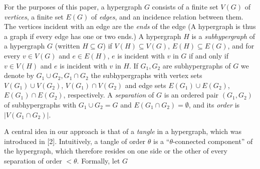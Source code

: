 For the purposes of this paper, a hypergraph $G$ consists of a finite set $V(G)$ of \textit{vertices}, a finite set $E(G)$ of \textit{edges}, and an incidence relation between them. The vertices incident with an edge are the \textit{ends} of the edge (A hypergraph is thus a graph if every edge has one or two ends.) A hypergraph $H$ is a \textit{subhypergraph} of a hypergraph $G$ (written $H \subseteq G$) if $V(H) \subseteq V(G)$, $E(H) \subseteq E(G)$, and for every $v \in V(G)$ and $e \in E(H)$, $e$ is incident with $v$ in $G$ if and only if $v \in V(H)$ and $e$ is incident with $v$ in $H$. If $G_1, G_2$ are subhypergraphs of $G$ we denote by $G_1 \cup G_2, G_1 \cap G_2$ the subhypergraphs with vertex sets $V(G_1) \cup V(G_2)$, $V(G_1) \cap V(G_2)$ and edge sets $E(G_1) \cup E(G_2)$, $E(G_1) \cap E(G_2)$, respectively. A \textit{separation} of $G$ is an ordered pair $(G_1, G_2)$ of subhypergraphs with $G_1 \cup G_2 = G$ and $E(G_1 \cap G_2) = \emptyset$, and its \textit{order} is $|V(G_1 \cap G_2)|$.

A central idea in our approach is that of a \textit{tangle} in a hypergraph, which was introduced in [2]. Intuitively, a tangle of order $\theta$ is a ``$\theta$-connected component'' of the hypergraph, which therefore resides on one side or the other of every separation of order $< \theta$. Formally, let $G$
